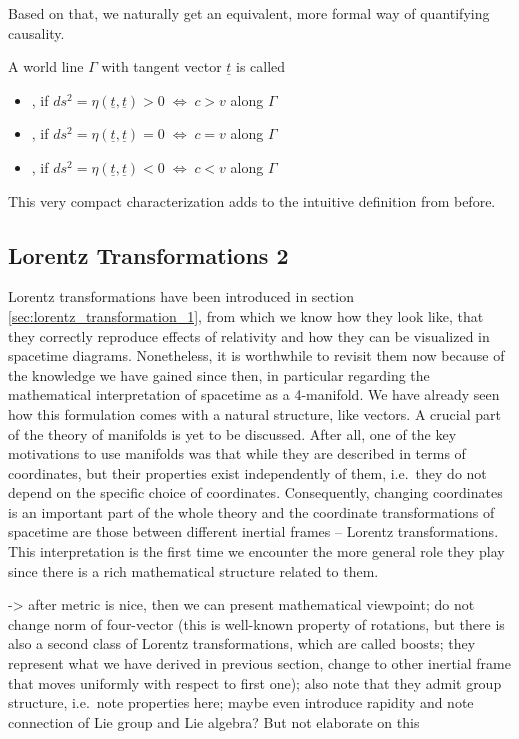 Based on that, we naturally get an equivalent, more formal way of quantifying causality.
\begin{defi}
A world line $\Gamma$ with tangent vector $\underline{t}$ is called
\begin{itemize}
\item {}, if $ds^2 = \eta(\underline{t}, \underline{t}) > 0 \; \Leftrightarrow \; c > v$ along $\Gamma$


\item {}, if $ds^2 = \eta(\underline{t}, \underline{t}) = 0 \; \Leftrightarrow \; c = v$ along $\Gamma$


\item {}, if $ds^2 = \eta(\underline{t}, \underline{t}) < 0 \; \Leftrightarrow \; c < v$ along $\Gamma$
\end{itemize}
\end{defi}
This very compact characterization adds to the intuitive definition from before.



		\subsection{Lorentz Transformations 2}\label{subsec:lorentz_transformation_2}
Lorentz transformations have been introduced in section \ref{sec:lorentz_transformation_1}, from which we know how they look like, that they correctly reproduce effects of relativity and how they can be visualized in spacetime diagrams. Nonetheless, it is worthwhile to revisit them now because of the knowledge we have gained since then, in particular regarding the mathematical interpretation of spacetime as a 4-manifold. We have already seen how this formulation comes with a natural structure, like vectors. A crucial part of the theory of manifolds is yet to be discussed. After all, one of the key motivations to use manifolds was that while they are described in terms of coordinates, but their properties exist independently of them, i.e.~they do not depend on the specific choice of coordinates. Consequently, changing coordinates is an important part of the whole theory and the coordinate transformations of spacetime are those between different inertial frames -- Lorentz transformations. This interpretation is the first time we encounter the more general role they play since there is a rich mathematical structure related to them.




-> after metric is nice, then we can present mathematical viewpoint; do not change norm of four-vector (this is well-known property of rotations, but there is also a second class of Lorentz transformations, which are called boosts; they represent what we have derived in previous section, change to other inertial frame that moves uniformly with respect to first one); also note that they admit group structure, i.e.~note properties here; maybe even introduce rapidity and note connection of Lie group and Lie algebra? But not elaborate on this

